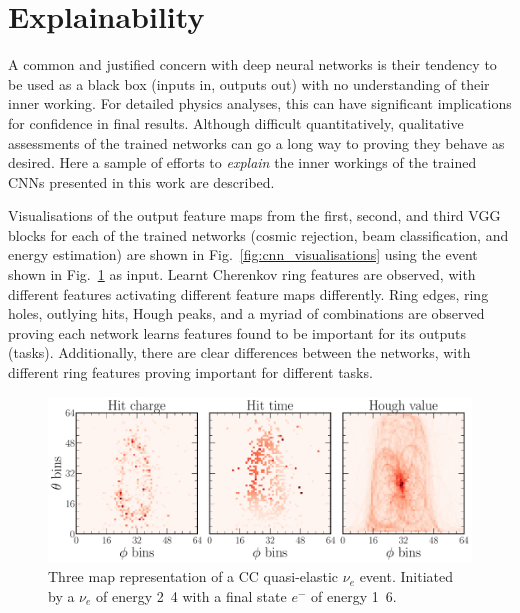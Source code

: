 \section{Explainability} %
\label{sec:results_explain} %

A common and justified concern with deep neural networks is their tendency to be used as a black
box (inputs in, outputs out) with no understanding of their inner working. For detailed physics
analyses, this can have significant implications for confidence in final results. Although
difficult quantitatively, qualitative assessments of the trained networks can go a long way to
proving they behave as desired. Here a sample of efforts to \emph{explain} the inner workings of
the trained CNNs presented in this work are described.

Visualisations of the output feature maps from the first, second, and third VGG blocks for each of
the trained networks (cosmic rejection, beam classification, and energy estimation) are shown in
Fig.~\ref{fig:cnn_visualisations} using the event shown in Fig.~\ref{fig:explain_example_event} as
input. Learnt Cherenkov ring features are observed, with different features activating different
feature maps differently. Ring edges, ring holes, outlying hits, Hough peaks, and a myriad of
combinations are observed proving each network learns features found to be important for its
outputs (tasks). Additionally, there are clear differences between the networks, with different
ring features proving important for different tasks.

\begin{figure} %
    \includegraphics[width=\textwidth]{diagrams/7-results/explain_example_event.pdf}
    \caption[Example CC quasi-elastic $\nu_{e}$ event for explainability]
    {Three map representation of a CC quasi-elastic $\nu_{e}$ event. Initiated by a $\nu_{e}$ of
        energy \unit{2.4}{\GeV} with a final state $e^{-}$ of energy \unit{1.6}{\GeV}.}
    \label{fig:explain_example_event}
\end{figure}


